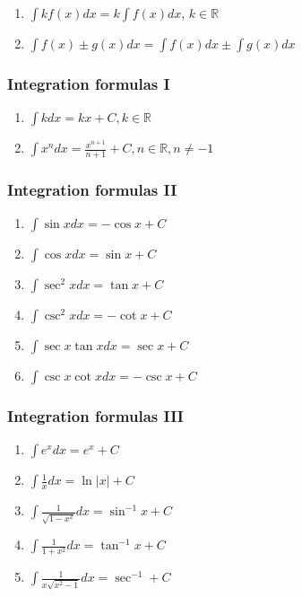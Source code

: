 \documentclass[
]{article}
\begin{document}
\begin{enumerate}
\def\labelenumi{\arabic{enumi}.}
\item
  \(\displaystyle\int kf(x)dx = k \int f(x)dx\), \(k \in \mathbb{R}\)
\item
  \(\displaystyle\int f(x) \pm g(x) dx = \int f(x)dx \pm \int g(x)dx\)
\end{enumerate}

\hypertarget{integration-formulas-i}{%
\subsubsection{Integration formulas I}\label{integration-formulas-i}}

\begin{enumerate}
\def\labelenumi{\arabic{enumi}.}
\item
  \(\displaystyle\int kdx = kx + C, k \in \mathbb{R}\)
\item
  \(\displaystyle\int x^ndx = \frac{x^{n+1}}{n+1}+C, n \in \mathbb{R}, n \neq -1\)
\end{enumerate}

\hypertarget{integration-formulas-ii}{%
\subsubsection{Integration formulas II}\label{integration-formulas-ii}}

\begin{enumerate}
\def\labelenumi{\arabic{enumi}.}
\item
  \(\displaystyle\int \sin xdx = -\cos x + C\)
\item
  \(\displaystyle\int \cos xdx = \sin x + C\)
\item
  \(\displaystyle\int \sec^2xdx = \tan x + C\)
\item
  \(\displaystyle\int \csc^2xdx = -\cot x + C\)
\item
  \(\displaystyle\int \sec x\tan xdx = \sec x + C\)
\item
  \(\displaystyle\int \csc x\cot xdx = -\csc x +C\)
\end{enumerate}

\hypertarget{integration-formulas-iii}{%
\subsubsection{Integration formulas
III}\label{integration-formulas-iii}}

\begin{enumerate}
\def\labelenumi{\arabic{enumi}.}
\item
  \(\displaystyle\int e^xdx =e^x +C\)
\item
  \(\displaystyle\int \frac{1}{x}dx=\ln|x|+C\)
\item
  \(\displaystyle\int \frac{1}{\sqrt{1-x^2}}dx = \sin^{-1}x +C\)
\item
  \(\displaystyle\int \frac{1}{1+x^2}dx = \tan^{-1}x +C\)
\item
  \(\displaystyle\int \frac{1}{x\sqrt{x^2-1}}dx= \sec^{-1}+C\)
\end{enumerate}
\end{document}
